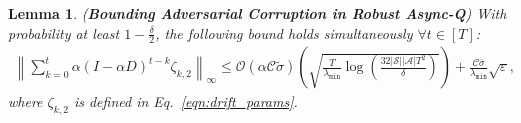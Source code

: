 \documentclass{article}
\newcommand{\mc}{\mathcal}
\newtheorem{lemma}{Lemma}
\begin{document}
\begin{lemma}
\label{lemma:noise_in_adversaries_part2} (\textbf{Bounding Adversarial Corruption in Robust Async-Q}) With probability at least $1- \frac{\delta}{2}$, the following bound holds simultaneously $\forall t \in [T]$: 
\begin{equation}\label{eqn:noise_in_adversaries_eqn}
\begin{aligned}
   \left\lVert \sum_{k=0}^{t} \alpha (I-\alpha D)^{t-k} \mathcal{\zeta}_{k,2}\right\rVert_\infty \le \mc{O}\left(\alpha \mc{C} \tilde{\sigma}\right)\left(\sqrt{\frac{T}{\lambda_{\texttt{min}}}\log\left(\frac{32\lvert\mc{S}\rvert\lvert\mc{A}\rvert T^2}{\delta}\right)}\right) + \frac{\mc{C}\bar{\sigma}}{\lambda_{\texttt{min}}}\sqrt{\varepsilon},
\end{aligned}
\end{equation}
where \(\zeta_{k,2}\) is defined in Eq.~\eqref{eqn:drift_params}.
\end{lemma}
\end{document}
